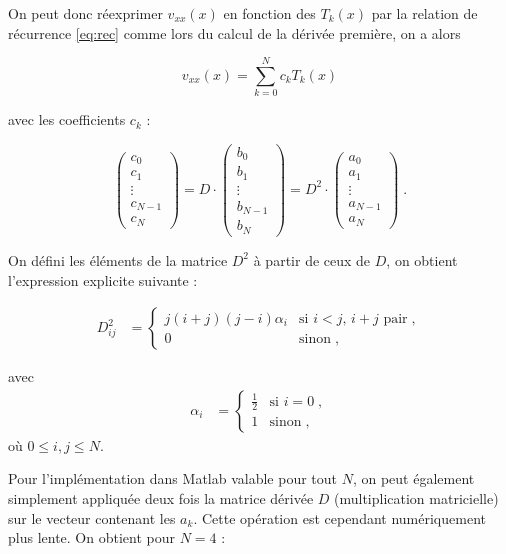\documentclass{report}
\begin{document}
On peut donc réexprimer $v_{xx}(x)$ en fonction des $T_{k}(x)$ par la relation de récurrence \eqref{eq:rec} comme lors du calcul de la dérivée première, on a alors 

\begin{equation}
v_{xx}(x) = \sum_{k=0}^N c_k T_k(x) 
\end{equation}

avec les coefficients $c_{k}$ :

\begin{equation}
\begin{pmatrix}
 c_{0}\\ 
 c_{1}\\ 
 \vdots\\ 
 c_{N-1}\\ 
 c_{N}
\end{pmatrix} 
= D \cdot \begin{pmatrix}
 b_0\\ 
 b_1\\ 
 \vdots\\ 
 b_{N-1}\\ 
 b_{N}
\end{pmatrix}
= D^2 \cdot \begin{pmatrix}
 a_0\\ 
 a_1\\ 
 \vdots\\ 
 a_{N-1}\\ 
 a_{N}
\end{pmatrix}\;.
\end{equation}

On défini les éléments de la matrice $D^2$ à partir de ceux de $D$, on obtient l'expression explicite suivante :

\begin{align}
D_{ij}^2 &= 
  \begin{cases}
    j(i+j)(j-i)\alpha_{i} & \text{si $i<j$, $i+j$ pair}\;, \\
0 & \text{sinon}\;,
  \end{cases}
  \end{align}
  
  avec 
  \begin{align}
\alpha_{i} &= 
  \begin{cases}
    \frac{1}{2} & \text{si $i =0$}\;, \\
1 & \text{sinon}\;,
  \end{cases}
  \end{align}
où $0 \leq i,j \leq N$.

Pour l'implémentation dans Matlab valable pour tout $N$, on peut également simplement appliquée deux fois la matrice dérivée $D$ (multiplication matricielle) sur le vecteur contenant les $a_{k}$. Cette opération est cependant numériquement plus lente. On obtient pour $N=4$ :
\end{document}
